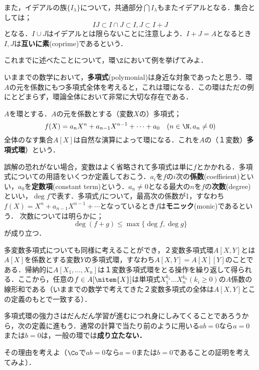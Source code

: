 また，イデアルの族$\{I_\lambda\}$について，共通部分$\bigcap I_\lambda$もまたイデアルとなる．集合としては；
\[IJ\subset I\cap J\subset I,J\subset I+J\]
となる．$I\cup J$はイデアルとは限らないことに注意しよう．$I+J=A$となるとき$I,J$は\textbf{互いに素}(coprime)であるという．


\begin{exer}
	これまでに述べたことについて，環$\Z$において例を挙げてみよ．
\end{exer}

いままでの数学において，\textbf{多項式}(polymonial)は身近な対象であったと思う．環$A$の元を係数にもつ多項式全体を考えると，これは環になる．この環はただの例にとどまらず，環論全体において非常に大切な存在である．

\begin{defi}[多項式環]
	$A$を環とする．$A$の元を係数とする（変数$X$の）多項式；
	\[f(X)=a_nX^n+a_{n-1}X^{n-1}+\dots+a_0\quad(n\in\N,a_n\neq0)\]
	全体のなす集合$A[X]$は自然な演算によって環になる．これを$A$の（１変数）\textbf{多項式環}）という．
\end{defi}
誤解の恐れがない場合，変数はよく省略されて多項式は単に$f$とかかれる．多項式についての用語をいくつか定義しておこう．$a_i$を$f$の$i$次の\textbf{係数}(coeffieient)といい，$a_0$を\textbf{定数項}(constant term)という．$a_n\neq0$となる最大の$n$を$f$の\textbf{次数}(degree)といい，$\deg f$で表す．多項式$f$について，最高次の係数が1，すなわち$f(X)=X^n+a_{n-1}X^{n-1}+\cdots$となっているとき$f$は\textbf{モニック}(monic)であるという． 次数については明らかに；
\[\deg (f+g)\leq\max\{\deg f,\deg g\}\]
が成り立つ．

多変数多項式についても同様に考えることができ，２変数多項式環$A[X,Y]$とは$A[X]$を係数とする変数$Y$の多項式環，すなわち$A[X,Y]=A[X][Y]$のことである．帰納的に$A[X_1,\dots,X_n]$は１変数多項式環をとる操作を繰り返して得られる．ここから，任意の$f\in A[\nitem{X}]$は単項式$X_1^{k_1}\dots X_n^{k_n} (k_i\geq0)$の$A$係数の線形和である（いままでの数学で考えてきた２変数多項式の全体は$A[X,Y]$とこの定義のもとで一致する）．

多項式環の強力さはだんだん学習が進むにつれ身にしみてくることであろうから，次の定義に進もう．通常の計算で当たり前のように用いる$ab=0$なら$a=0$または$b=0$は，一般の環では\textbf{成り立たない．}

\begin{exer}
	その理由を考えよ（$\Co$で$ab=0$なら$a=0$または$b=0$であることの証明を考えてみよ）．
\end{exer}

